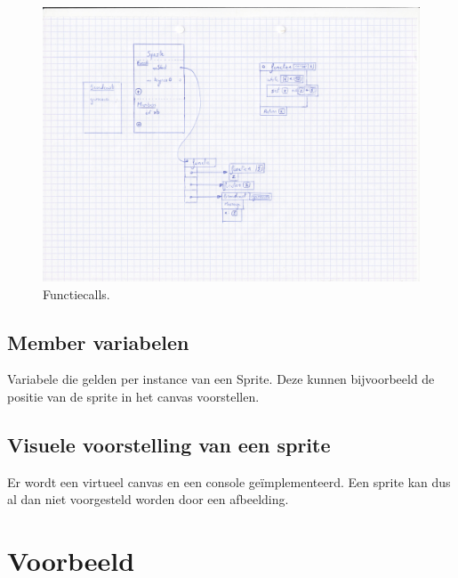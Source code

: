 \documentclass[]{article}
\begin{document}
\begin{figure}
  \centering
  
\includegraphics[scale=0.2]{mockups/functiecalls.jpg}
  \caption{Functiecalls.} \label{functiecalls}
\end{figure}

\subsection{Member variabelen}
Variabele die gelden per instance van een Sprite. Deze kunnen bijvoorbeeld de positie van de sprite in het canvas voorstellen.
\subsection{Visuele voorstelling van een sprite}
Er wordt een virtueel canvas en een console ge\"{i}mplementeerd. Een sprite kan dus al dan niet voorgesteld worden door een afbeelding.
 
 \section{Voorbeeld}
 \label{Voorbeeld}
\end{document}
